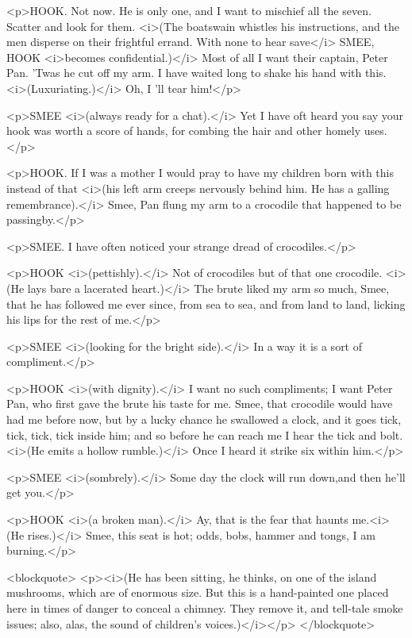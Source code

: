 <p>HOOK. Not now. He is only one, and I want to mischief all the
seven. Scatter and look for them. <i>(The boatswain whistles his
instructions, and the men disperse on their frightful errand. With
none to hear save</i> SMEE, HOOK <i>becomes confidential.)</i> Most
of all I want their captain, Peter Pan. 'Twas he cut off my arm. I
have waited long to shake his hand with this. <i>(Luxuriating.)</i>
Oh, I 'll tear him!</p>

<p>SMEE <i>(always ready for a chat).</i> Yet I have oft heard you
say your hook was worth a score of hands, for combing the hair and
other homely uses.</p>

<p>HOOK. If I was a mother I would pray to have my children born with
this instead of that <i>(his left arm creeps nervously behind him. He
has a galling remembrance).</i> Smee, Pan flung my arm to a crocodile
that happened to be passingby.</p>

<p>SMEE. I have often noticed your strange dread of crocodiles.</p>

<p>HOOK <i>(pettishly).</i> Not of crocodiles but of that one
crocodile. <i>(He lays bare a lacerated heart.)</i> The brute liked
my arm so much, Smee, that he has followed me ever since, from sea to
sea, and from land to land, licking his lips for the rest of me.</p>

<p>SMEE <i>(looking for the bright side).</i> In a way it is a sort
of compliment.</p>

<p>HOOK <i>(with dignity).</i> I want no such compliments; I want
Peter Pan, who first gave the brute his taste for me. Smee, that
crocodile would have had me before now, but by a lucky chance he
swallowed a clock, and it goes tick, tick, tick, tick inside him; and
so before he can reach me I hear the tick and bolt. <i>(He emits a
hollow rumble.)</i> Once I heard it strike six within him.</p>

<p>SMEE <i>(sombrely).</i> Some day the clock will run down,and then
he'll get you.</p>

<p>HOOK <i>(a broken man).</i> Ay, that is the fear that haunts
me.<i>(He rises.)</i> Smee, this seat is hot; odds, bobs, hammer and
tongs, I am burning.</p>

<blockquote>
<p><i>(He has been sitting, he thinks, on one of the island
mushrooms, which are of enormous size. But this is a hand-painted one
placed here in times of danger to conceal a chimney. They remove it,
and tell-tale smoke issues; also, alas, the sound of children's
voices.)</i></p>
</blockquote>

